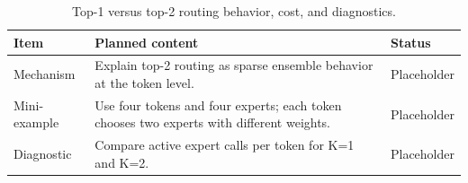 \begin{table}[H]
\centering
\caption{Top-1 versus top-2 routing behavior, cost, and diagnostics.}
\label{tab:ch05-why-top-2-changes-the-routing-story}
\begin{tabularx}{\textwidth}{p{}X p{}}
\toprule
Item & Planned content & Status \\
\midrule
Mechanism & Explain top-2 routing as sparse ensemble behavior at the token level. & Placeholder \\
Mini-example & Use four tokens and four experts; each token chooses two experts with different weights. & Placeholder \\
Diagnostic & Compare active expert calls per token for K=1 and K=2. & Placeholder \\
\bottomrule
\end{tabularx}
\end{table}
